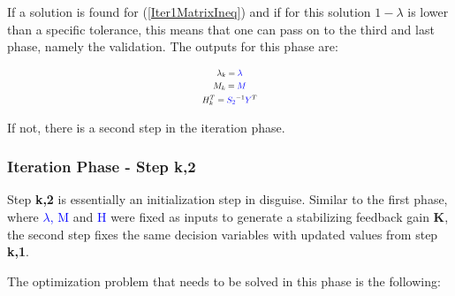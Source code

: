 If a solution is found for (\ref{Iter1MatrixIneq}) and if for this solution $1-\lambda$ is lower than a specific tolerance, this means that one can pass on to the third and last phase, namely the validation. The outputs for this phase are:

\begin{equation}
\resizebox{0.13\textwidth}{!}{$
    \begin{gathered}
        \lambda_k=\textcolor{blue}{\lambda}  \\
        M_k = \textcolor{blue}{M} \\
        H_k^T = \textcolor{blue}{S_2}^{-1} \textcolor{blue}{Y}^T
    \end{gathered}$}
    \label{OutputsIterStap2}
\end{equation}

If not, there is a second step in the iteration phase.

\subsubsection{Iteration Phase - Step k,2}
Step \textbf{k,2} is essentially an initialization step in disguise. Similar to the first phase, where \textcolor{blue}{$\lambda$, M} and \textcolor{blue}{H} were fixed as inputs to generate a stabilizing feedback gain \textbf{K}, the second step fixes the same decision variables with updated values from step \textbf{k,1}.

The optimization problem that needs to be solved in this phase is the following:

\vspace{-0.5cm}


